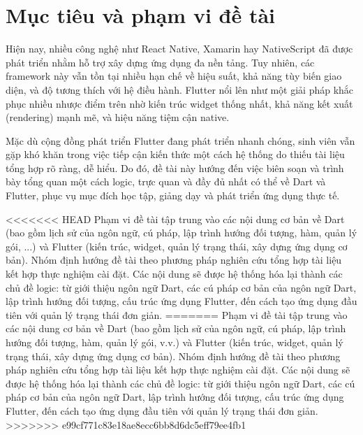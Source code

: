\section{Mục tiêu và phạm vi đề tài}
\label{section:1.2}

Hiện nay, nhiều công nghệ như React Native, Xamarin hay NativeScript đã được phát triển nhằm hỗ trợ xây dựng ứng dụng đa nền tảng. Tuy nhiên, các framework này vẫn tồn tại nhiều hạn chế về hiệu suất, khả năng tùy biến giao diện, và độ tương thích với hệ điều hành. Flutter nổi lên như một giải pháp khắc phục nhiều nhược điểm trên nhờ kiến trúc widget thống nhất, khả năng kết xuất (rendering) mạnh mẽ, và hiệu năng tiệm cận native.

Mặc dù cộng đồng phát triển Flutter đang phát triển nhanh chóng, sinh viên vẫn gặp khó khăn trong việc tiếp cận kiến thức một cách hệ thống do thiếu tài liệu tổng hợp rõ ràng, dễ hiểu. Do đó, đề tài này hướng đến việc biên soạn và trình bày tổng quan một cách logic, trực quan và đầy đủ nhất có thể về Dart và Flutter, phục vụ mục đích học tập, giảng dạy và phát triển ứng dụng thực tế.

<<<<<<< HEAD
Phạm vi đề tài tập trung vào các nội dung cơ bản về Dart (bao gồm lịch sử của ngôn ngữ, cú pháp, lập trình hướng đối tượng, hàm, quản lý gói, ...) và Flutter (kiến trúc, widget, quản lý trạng thái, xây dựng ứng dụng cơ bản). Nhóm định hướng đề tài theo phương pháp nghiên cứu tổng hợp tài liệu kết hợp thực nghiệm cài đặt. Các nội dung sẽ được hệ thống hóa lại thành các chủ đề logic: từ giới thiệu ngôn ngữ Dart, các cú pháp cơ bản của ngôn ngữ Dart, lập trình hướng đối tượng, cấu trúc ứng dụng Flutter, đến cách tạo ứng dụng đầu tiên với quản lý trạng thái đơn giản.
=======
Phạm vi đề tài tập trung vào các nội dung cơ bản về Dart (bao gồm lịch sử của ngôn ngữ, cú pháp, lập trình hướng đối tượng, hàm, quản lý gói, v.v.) và Flutter (kiến trúc, widget, quản lý trạng thái, xây dựng ứng dụng cơ bản). Nhóm định hướng đề tài theo phương pháp nghiên cứu tổng hợp tài liệu kết hợp thực nghiệm cài đặt. Các nội dung sẽ được hệ thống hóa lại thành các chủ đề logic: từ giới thiệu ngôn ngữ Dart, các cú pháp cơ bản của ngôn ngữ Dart, lập trình hướng đối tượng, cấu trúc ứng dụng Flutter, đến cách tạo ứng dụng đầu tiên với quản lý trạng thái đơn giản.
>>>>>>> e99cf771c83e18ae8ecc6bb8d6dc5eff79ee4fb1

